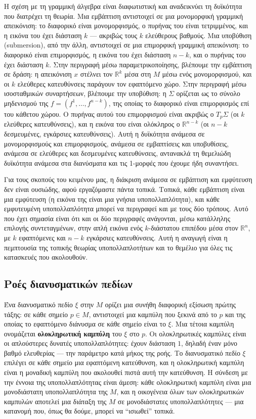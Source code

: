 \documentclass[12pt]{article}
\begin{document}
Η σχέση με τη γραμμική άλγεβρα είναι διαφωτιστική και αναδεικνύει τη δυϊκότητα που διατρέχει τη θεωρία. Μια εμβάπτιση αντιστοιχεί σε μια μονομορφική γραμμική απεικόνιση: το διαφορικό είναι μονομορφισμός, ο πυρήνας του είναι τετριμμένος, και η εικόνα του έχει διάσταση $k$ --- ακριβώς τους $k$ ελεύθερους βαθμούς. Μια υποβύθιση (submersion), από την άλλη, αντιστοιχεί σε μια επιμορφική γραμμική απεικόνιση: το διαφορικό είναι επιμορφισμός, η εικόνα του έχει διάσταση $n-k$, και ο πυρήνας του έχει διάσταση $k$. Στην περιγραφή μέσω παραμετρικοποίησης, βλέπουμε την εμβάπτιση σε δράση: η απεικόνιση $x$ στέλνει τον $\mathbb{R}^k$ μέσα στη $M$ μέσω ενός μονομορφισμού, και οι $k$ ελεύθερες κατευθύνσεις παράγουν τον εφαπτόμενο χώρο. Στην περιγραφή μέσω ισοσταθμικών συναρτήσεων, βλέπουμε την υποβύθιση: η $\Sigma$ ορίζεται ως το σύνολο μηδενισμού της $f = (f^1, \dots, f^{n-k})$, της οποίας το διαφορικό είναι επιμορφισμός επί του κάθετου χώρου. Ο πυρήνας αυτού του επιμορφισμού είναι ακριβώς ο $T_p\Sigma$ (οι $k$ ελεύθερες κατευθύνσεις), και η εικόνα του είναι ολόκληρος ο $\mathbb{R}^{n-k}$ (οι $n-k$ δεσμευμένες, εγκάρσιες κατευθύνσεις). Αυτή η δυϊκότητα ανάμεσα σε μονομορφισμούς και επιμορφισμούς, ανάμεσα σε εμβαπτίσεις και υποβυθίσεις, ανάμεσα σε ελεύθερες και δεσμευμένες κατευθύνσεις, αντανακλά τη θεμελιώδη δυϊκότητα ανάμεσα στα διανύσματα και τις 1-μορφές που έχουμε ήδη συναντήσει.

Για τους σκοπούς του κειμένου μας, η διάκριση ανάμεσα σε εμβάπτιση και εμφύτευση δεν είναι ουσιώδης, αφού εργαζόμαστε πάντα τοπικά. Τοπικά, κάθε εμβάπτιση είναι μια εμφύτευση (η εικόνα της είναι μια γνήσια υποπολλαπλότητα), και κάθε εμφυτευμένη υποπολλαπλότητα μπορεί να περιγραφεί και με τους δύο τρόπους. Αυτό που έχει σημασία είναι ότι και οι δύο περιγραφές ανάγονται, μέσω κατάλληλης επιλογής συντεταγμένων, στην απλή εικόνα ενός $k$-διάστατου επιπέδου μέσα στον $\mathbb{R}^n$, με $k$ εφαπτόμενες και $n-k$ εγκάρσιες κατευθύνσεις. Αυτή η αναγωγή είναι η πεμπτουσία της τοπικής θεωρίας υποπολλαπλοτήτων και το θεμέλιο για όλες τις κατασκευές που ακολουθούν.

\subsection{Ροές διανυσματικών πεδίων}

Ένα διανυσματικό πεδίο $\xi$ στην $M$ ορίζει μια συνήθη διαφορική εξίσωση πρώτης τάξης: σε κάθε σημείο $p \in M$, αντιστοιχεί μια καμπύλη που ξεκινά από το $p$ και της οποίας το εφαπτόμενο διάνυσμα σε κάθε σημείο είναι το $\xi$. Μια τέτοια καμπύλη ονομάζεται \textbf{ολοκληρωτική καμπύλη} του $\xi$ στο $p$. Οι ολοκληρωτικές καμπύλες είναι οι απλούστερες δυνατές υποπολλαπλότητες: έχουν διάσταση $1$, δηλαδή έναν μόνο βαθμό ελευθερίας --- την παράμετρο κατά μήκος της ροής. Το διανυσματικό πεδίο $\xi$ επιλέγει σε κάθε σημείο μια εφαπτόμενη κατεύθυνση, και η ολοκληρωτική καμπύλη είναι η μοναδική καμπύλη που ακολουθεί πιστά αυτή την κατεύθυνση. Η σύνδεση με την έννοια της υποπολλαπλότητας είναι άμεση: κάθε ολοκληρωτική καμπύλη είναι μια μονοδιάστατη υποπολλαπλότητα της $M$, και η οικογένεια όλων των ολοκληρωτικών καμπυλών αποτελεί μια διάταξη της $M$ σε μονοδιάστατες υποπολλαπλότητες --- μια κατανομή που, όπως θα δούμε, μπορεί να ``ισιωθεί'' τοπικά.
\end{document}
